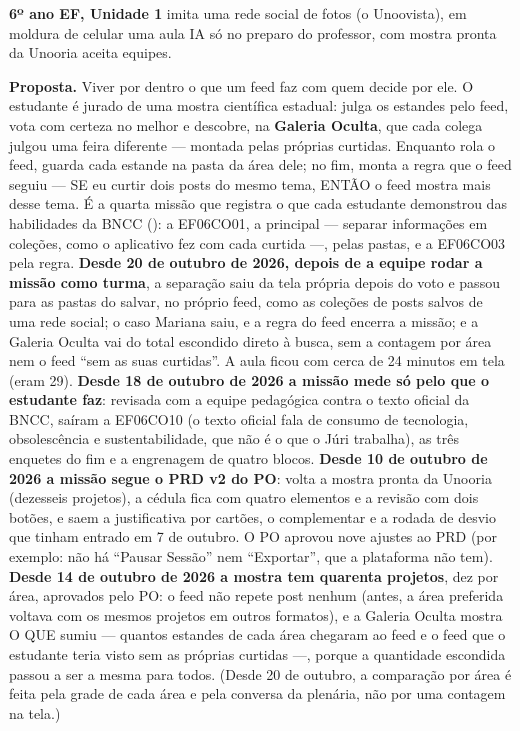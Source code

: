 \textbf{6º ano EF, Unidade 1} \textperiodcentered{} imita uma rede social de
fotos (o Unoovista), em moldura de celular \textperiodcentered{} uma aula
\textperiodcentered{} IA só no preparo do professor, com mostra pronta da
Unooria \textperiodcentered{} aceita equipes.

\textbf{Proposta.} Viver por dentro o que um feed faz com quem decide por ele.
O estudante é jurado de uma mostra científica estadual: julga os estandes pelo
feed, vota com certeza no melhor e descobre, na \textbf{Galeria Oculta}, que
cada colega julgou uma feira diferente --- montada pelas próprias curtidas.
Enquanto rola o feed, guarda cada estande na pasta da área dele; no fim, monta
a regra que o feed seguiu --- SE eu curtir dois posts do mesmo tema, ENTÃO o
feed mostra mais desse tema. É a quarta missão que registra o que cada
estudante demonstrou das habilidades da BNCC (): a EF06CO01, a
principal --- separar informações em coleções, como o aplicativo fez com cada
curtida ---, pelas pastas, e a EF06CO03 pela regra. \textbf{Desde 20 de
outubro de 2026, depois de a equipe rodar a missão como turma}, a separação
saiu da tela própria depois do voto e passou para as pastas do salvar, no
próprio feed, como as coleções de posts salvos de uma rede social; o caso
Mariana saiu, e a regra do feed encerra a missão; e a Galeria Oculta vai do
total escondido direto à busca, sem a contagem por área nem o feed
\enquote{sem as suas curtidas}. A aula ficou com cerca de 24 minutos em tela
(eram 29). \textbf{Desde 18 de
outubro de 2026 a missão mede só pelo que o estudante faz}: revisada com a
equipe pedagógica contra o texto oficial da BNCC, saíram a EF06CO10 (o texto
oficial fala de consumo de tecnologia, obsolescência e sustentabilidade, que
não é o que o Júri trabalha), as três enquetes do fim e a engrenagem de quatro
blocos. \textbf{Desde 10 de outubro de 2026 a missão segue o PRD v2 do
PO}: volta a mostra pronta da Unooria (dezesseis projetos), a cédula fica com
quatro elementos e a revisão com dois botões, e saem a justificativa por
cartões, o complementar e a rodada de desvio que tinham entrado em 7 de
outubro. O PO aprovou nove ajustes ao PRD (por exemplo: não há
\enquote{Pausar Sessão} nem \enquote{Exportar}, que a plataforma não tem).
\textbf{Desde 14 de outubro de 2026 a mostra tem quarenta projetos}, dez por
área, aprovados pelo PO: o feed não repete post nenhum (antes, a área preferida
voltava com os mesmos projetos em outros formatos), e a Galeria Oculta mostra
O QUE sumiu --- quantos estandes de cada área chegaram ao feed e o feed que o
estudante teria visto sem as próprias curtidas ---, porque a quantidade
escondida passou a ser a mesma para todos. (Desde 20 de outubro, a comparação
por área é feita pela grade de cada área e pela conversa da plenária, não por
uma contagem na tela.)

